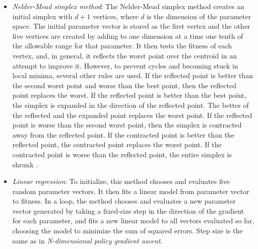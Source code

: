 \begin{itemize}
\item \emph{Nelder-Mead simplex method}: The Nelder-Mead simplex
  method \cite{nm} creates an initial simplex with $d+1$ vertices,
  where $d$ is the dimension of the parameter space. The initial
  parameter vector is stored as the first vertex and the other five
  vertices are created by adding to one dimension at a time one tenth
  of the allowable range for that parameter. It then tests the fitness
  of each vertex, and, in general, it reflects the worst point over
  the centroid in an attempt to improve it.  However, to prevent
  cycles and becoming stuck in local minima, several other rules are
  used.  If the reflected point is better than the second worst point
  and worse than the best point, then the reflected point replaces the
  worst. If the reflected point is better than the best point, the
  simplex is expanded in the direction of the reflected point. The
  better of the reflected and the expanded point replaces the worst
  point. If the reflected point is worse than the second worst point,
  then the simplex is contracted away from the reflected point. If the
  contracted point is better than the reflected point, the contracted
  point replaces the worst point. If the contracted point is worse
  than the reflected point, the entire simplex is shrunk \cite{nm}.

\item \emph{Linear regression}: To initialize, this method chooses and
  evaluates five random parameter vectors. It then fits a linear model
  from parameter vector to fitness. In a loop, the method chooses and
  evaluates a new parameter vector generated by taking a fixed-size
  step in the direction of the gradient for each parameter, and fits a
  new linear model to all vectors evaluated so far, choosing the model
  to minimize the sum of squared errors. Step size is the same as in
  \emph{N-dimensional policy gradient ascent}.


\end{itemize}
